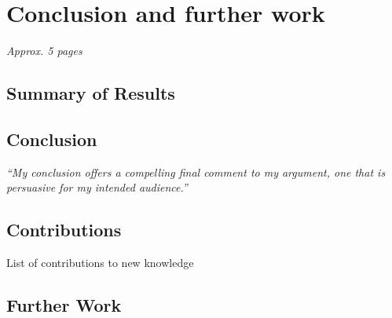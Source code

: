 \chapter{Conclusion and further work}
\label{ch:conclusion}
\textit{Approx. 5 pages}

\section{Summary of Results}

\section{Conclusion}
\emph{``My conclusion offers a compelling final comment to my argument, one that is persuasive for my
intended audience.''}

\section{Contributions}
List of contributions to new knowledge

\section{Further Work}

